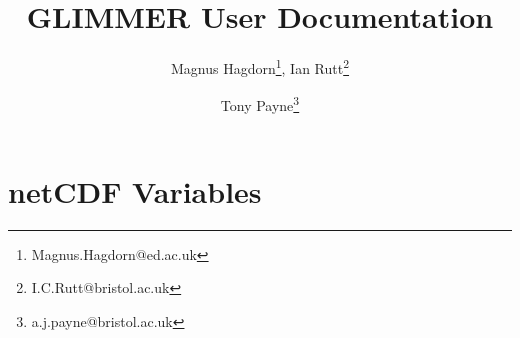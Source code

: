 \newcommand{\dir}{ug}

\pagestyle{myheadings}



\title{GLIMMER {\glimmerver} User Documentation}
\author{Magnus Hagdorn\thanks{Magnus.Hagdorn@ed.ac.uk}, Ian
Rutt\thanks{I.C.Rutt@bristol.ac.uk} \and Tony Payne\thanks{a.j.payne@bristol.ac.uk}}

\maketitle
\tableofcontents
\newpage


\appendix
\section{netCDF Variables}


